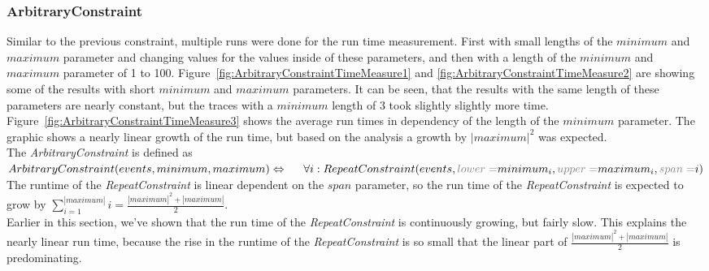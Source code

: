 \subsubsection{ArbitraryConstraint}
	Similar to the previous constraint, multiple runs were done for the run time measurement. First with small lengths of the $minimum$ and $maximum$ parameter and changing values for the values inside of these parameters, and then with a length of the $minimum$ and $maximum$ parameter of 1 to 100. Figure~\ref{fig:ArbitraryConstraintTimeMeasure1} and \ref{fig:ArbitraryConstraintTimeMeasure2} are showing some of the results with short $minimum$ and $maximum$ parameters. It can be seen, that the results with the same length of these parameters are nearly constant, but the traces with a $minimum$ length of 3 took slightly slightly more time. Figure~\ref{fig:ArbitraryConstraintTimeMeasure3} shows the average run times in dependency of the length of the $minimum$ parameter. The graphic shows a nearly linear growth of the run time, but based on the analysis a growth by $|maximum|^2$ was expected.\\
	The \textit{ArbitraryConstraint} is defined as\\[10pt]
	\begin{math}
		ArbitraryConstraint(events, minimum, maximum)\Leftrightarrow\\
		\hspace{0.5cm} \forall i: RepeatConstraint(events, \textcolor{gray}{lower=}minimum_i, \textcolor{gray}{upper=}maximum_i, \textcolor{gray}{span=}i)
	\end{math}\\[10pt]
	The runtime of the \textit{RepeatConstraint} is linear dependent on the $span$ parameter, so the run time of the \textit{RepeatConstraint} is expected to grow by $\sum_{i=1}^{|maximum|}i=\frac{|maximum|^2+|maximum|}{2}$.\\
	Earlier in this section, we've shown that the run time of the \textit{RepeatConstraint} is continuously growing, but fairly slow. This explains the nearly linear run time, because the rise in the runtime of the \textit{RepeatConstraint} is so small that the linear part of $\frac{|maximum|^2+|maximum|}{2}$ is predominating.
